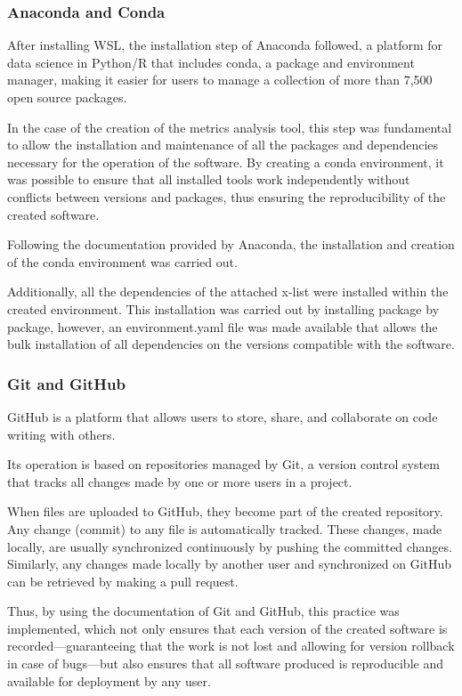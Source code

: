 \subsubsection{\textbf{Anaconda and Conda}}

After installing WSL, the installation step of Anaconda followed, a platform for data science in Python/R that includes conda, a package and environment manager, making it easier for users to manage a collection of more than 7,500 open source packages. \cite{anaconda1}

In the case of the creation of the metrics analysis tool, this step was fundamental to allow the installation and maintenance of all the packages and dependencies necessary for the operation of the software. By creating a conda environment, it was possible to ensure that all installed tools work independently without conflicts between versions and packages, thus ensuring the reproducibility of the created software. \cite{anaconda2}

Following the documentation provided by Anaconda, the installation and creation of the conda environment was carried out. \cite{anaconda3} 

Additionally, all the dependencies of the attached x-list were installed within the created environment. This installation was carried out by installing package by package, however, an environment.yaml file was made available that allows the bulk installation \cite{anaconda4} of all dependencies on the versions compatible with the software.

\subsubsection{\textbf{Git and GitHub}}

GitHub is a platform that allows users to store, share, and collaborate on code writing with others.

Its operation is based on repositories managed by Git, a version control system that tracks all changes made by one or more users in a project.

When files are uploaded to GitHub, they become part of the created repository. Any change (commit) to any file is automatically tracked. These changes, made locally, are usually synchronized continuously by pushing the committed changes. Similarly, any changes made locally by another user and synchronized on GitHub can be retrieved by making a pull request.

Thus, by using the documentation of Git and GitHub, this practice was implemented, which not only ensures that each version of the created software is recorded—guaranteeing that the work is not lost and allowing for version rollback in case of bugs—but also ensures that all software produced is reproducible and available for deployment by any user. \cite{github}


